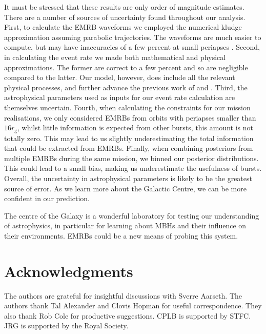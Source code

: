 \documentclass[useAMS,usedcolumn,usegraphicx,usenatbib]{mn2e}
\newcommand{\sub}[1]{\ensuremath{_\mathrm{#1}}}
\begin{document}
It must be stressed that these results are only order of magnitude estimates. There are a number of sources of uncertainty found throughout our analysis. First, to calculate the EMRB waveforms we employed the numerical kludge approximation assuming parabolic trajectories. The waveforms are much easier to compute, but may have inaccuracies of a few percent at small periapses \citep{Berry2013}. Second, in calculating the event rate we made both mathematical and physical approximations. The former are correct to a few percent and so are negligible compared to the latter. Our model, however, does include all the relevant physical processes, and further advance the previous work of \citet{Rubbo2006} and \citet{Hopman2007}. Third, the astrophysical parameters used as inputs for our event rate calculation are themselves uncertain. Fourth, when calculating the constraints for our mission realisations, we only considered EMRBs from orbits with periapses smaller than $16 r\sub{g}$, whilst little information is expected from other bursts, this amount is not totally zero. This may lead to us slightly underestimating the total information that could be extracted from EMRBs. Finally, when combining posteriors from multiple EMRBs during the same mission, we binned our posterior distributions. This could lead to a small bias, making us underestimate the usefulness of bursts. Overall, the uncertainty in astrophysical parameters is likely to be the greatest source of error. As we learn more about the Galactic Centre, we can be more confident in our prediction.

The centre of the Galaxy is a wonderful laboratory for testing our understanding of astrophysics, in particular for learning about MBHs and their influence on their environments. EMRBs could be a new means of probing this system.

\section*{Acknowledgments}
The authors are grateful for insightful discussions with Sverre Aarseth. The authors thank Tal Alexander and Clovis Hopman for useful correspondence. They also thank Rob Cole for productive suggestions. CPLB is supported by STFC. JRG is supported by the Royal Society.




\appendix
\end{document}
